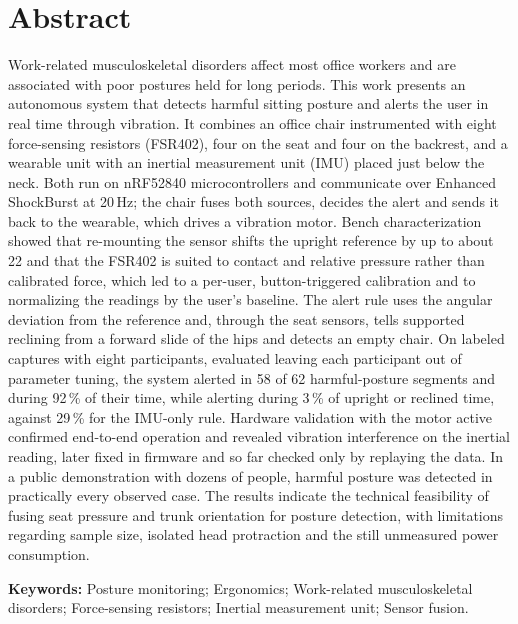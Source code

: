 \section*{Abstract}
\noindent
Work-related musculoskeletal disorders affect most office workers and are
associated with poor postures held for long periods. This work presents an
autonomous system that detects harmful sitting posture and alerts the user in
real time through vibration. It combines an office chair instrumented with
eight force-sensing resistors (FSR402), four on the seat and four on the
backrest, and a wearable unit with an inertial measurement unit (IMU) placed
just below the neck. Both run on nRF52840 microcontrollers and communicate over
Enhanced ShockBurst at 20\,Hz; the chair fuses both sources, decides the alert
and sends it back to the wearable, which drives a vibration motor. Bench
characterization showed that re-mounting the sensor shifts the upright
reference by up to about 22\degree{} and that the FSR402 is suited to contact
and relative pressure rather than calibrated force, which led to a per-user,
button-triggered calibration and to normalizing the readings by the user's
baseline. The alert rule uses the angular deviation from the reference and,
through the seat sensors, tells supported reclining from a forward slide of the
hips and detects an empty chair. On labeled captures with eight participants,
evaluated leaving each participant out of parameter tuning, the system alerted
in 58 of 62 harmful-posture segments and during 92\,\% of their time, while
alerting during 3\,\% of upright or reclined time, against 29\,\% for the
IMU-only rule. Hardware validation with the motor active confirmed end-to-end
operation and revealed vibration interference on the inertial reading, later
fixed in firmware and so far checked only by replaying the data. In a public demonstration with dozens of people, harmful
posture was detected in practically every observed case. The results indicate
the technical feasibility of fusing seat pressure and trunk orientation for
posture detection, with limitations regarding sample size, isolated head
protraction and the still unmeasured power consumption.

\vspace{0.8em}
\noindent\textbf{Keywords:} Posture monitoring; Ergonomics; Work-related
musculoskeletal disorders; Force-sensing resistors; Inertial measurement unit;
Sensor fusion.
